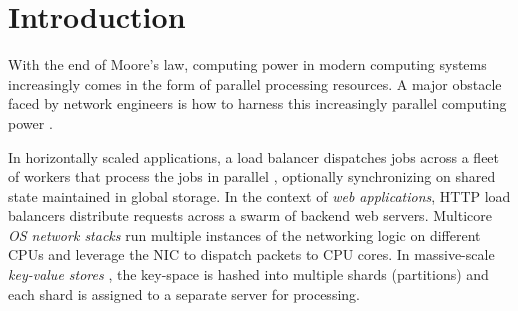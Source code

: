 \section{Introduction}\label{sec:introduction}










With the end of Moore's law, computing power in modern computing systems increasingly comes in the form of parallel processing resources.  A major obstacle faced by network engineers is how to harness this increasingly parallel computing power \cite{265065, 10.5555/3307441.3307467, 10.1145/2815400.2815423, 10.1145/3098822.3098826, 10.5555/3154630.3154639}.

In horizontally scaled applications, a load balancer dispatches jobs across a fleet of workers that process the jobs in parallel \cite{10.5555/3235491}, optionally synchronizing on shared state maintained in global storage.  In the context of \emph{web applications}, HTTP load balancers \cite{194966, 211279, 9552525} distribute requests across a swarm of backend web servers.  %
Multicore \emph{OS network stacks} \cite{211263, 10.1145/3359989.3365412, 10.1145/3452296.3472914} run multiple instances of the networking logic on different CPUs and leverage the NIC to dispatch packets to CPU cores. %
In massive-scale \emph{key-value stores} \cite{ghigoff2021bmc}, the key-space is hashed into multiple shards (partitions) and each shard is assigned to a separate server for processing.

